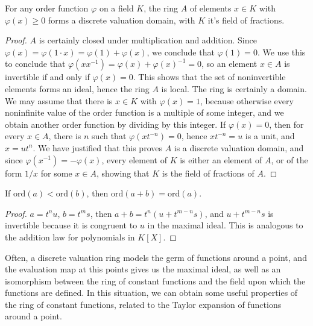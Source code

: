\begin{prop}
    For any order function $\varphi$ on a field $K$, the ring $A$ of elements $x \in K$ with $\varphi(x) \geq 0$ forms a discrete valuation domain, with $K$ it's field of fractions.
\end{prop}
\begin{proof}
    $A$ is certainly closed under multiplication and addition. Since $\varphi(x) = \varphi(1 \cdot x) = \varphi(1) + \varphi(x)$, we conclude that $\varphi(1) = 0$. We use this to conclude that $\varphi(xx^{-1}) = \varphi(x) + \varphi(x)^{-1} = 0$, so an element $x \in A$ is invertible if and only if $\varphi(x) = 0$. This shows that the set of noninvertible elements forms an ideal, hence the ring $A$ is local. The ring is certainly a domain. We may assume that there is $x \in K$ with $\varphi(x) = 1$, because otherwise every noninfinite value of the order function is a multiple of some integer, and we obtain another order function by dividing by this integer. If $\varphi(x) = 0$, then for every $x \in A$, there is $n$ such that $\varphi(xt^{-n}) = 0$, hence $xt^{-n} = u$ is a unit, and $x = ut^n$. We have justified that this proves $A$ is a discrete valuation domain, and since $\varphi(x^{-1}) = -\varphi(x)$, every element of $K$ is either an element of $A$, or of the form $1/x$ for some $x \in A$, showing that $K$ is the field of fractions of $A$.
\end{proof}

\begin{prop}
    If $\text{ord}(a) < \text{ord}(b)$, then $\text{ord}(a + b) = \text{ord}(a)$.
\end{prop}
\begin{proof}
    $a = t^nu$, $b = t^ms$, then $a + b = t^n(u + t^{m-n}s)$, and $u + t^{m-n}s$ is invertible because it is congruent to $u$ in the maximal ideal. This is analogous to the addition law for polynomials in $K[X]$.
\end{proof}

Often, a discrete valuation ring models the germ of functions around a point, and the evaluation map at this points gives us the maximal ideal, as well as an isomorphism between the ring of constant functions and the field upon which the functions are defined. In this situation, we can obtain some useful properties of the ring of constant functions, related to the Taylor expansion of functions around a point.

